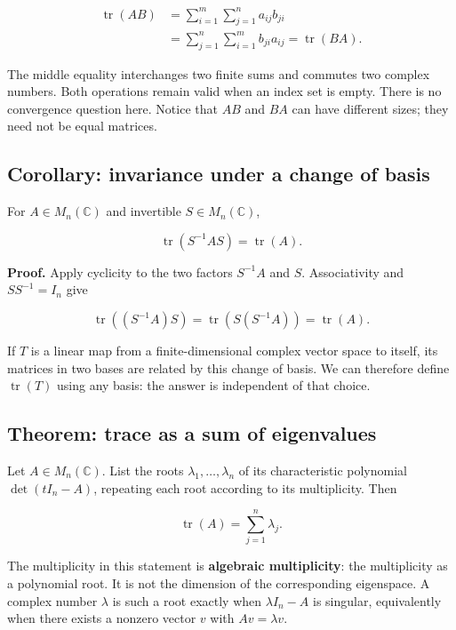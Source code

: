 \[
\begin{aligned}
\operatorname{tr}(AB)
&=\sum_{i=1}^{m}\sum_{j=1}^{n}a_{ij}b_{ji}\\
&=\sum_{j=1}^{n}\sum_{i=1}^{m}b_{ji}a_{ij}
=\operatorname{tr}(BA).
\end{aligned}
\]

The middle equality interchanges two finite sums and commutes two complex numbers. Both operations remain valid when an index set is empty. There is no convergence question here. Notice that \(AB\) and \(BA\) can have different sizes; they need not be equal matrices.

\subsection{Corollary: invariance under a change of basis}\label{linear-algebra.trace-similarity}

For \(A\in M_n(\mathbb C)\) and invertible \(S\in M_n(\mathbb C)\),

\[
\operatorname{tr}(S^{-1}AS)=\operatorname{tr}(A).
\]

\textbf{Proof.} Apply cyclicity to the two factors \(S^{-1}A\) and \(S\). Associativity and \(SS^{-1}=I_n\) give

\[
\operatorname{tr}((S^{-1}A)S)
=\operatorname{tr}(S(S^{-1}A))
=\operatorname{tr}(A).
\]

If \(T\) is a linear map from a finite-dimensional complex vector space to itself, its matrices in two bases are related by this change of basis. We can therefore define \(\operatorname{tr}(T)\) using any basis: the answer is independent of that choice.

\subsection{Theorem: trace as a sum of eigenvalues}\label{linear-algebra.trace-eigenvalue-sum}

Let \(A\in M_n(\mathbb C)\). List the roots \(\lambda_1,\ldots,\lambda_n\) of its characteristic polynomial \(\det(tI_n-A)\), repeating each root according to its multiplicity. Then

\[
\operatorname{tr}(A)=\sum_{j=1}^{n}\lambda_j.
\]

The multiplicity in this statement is \textbf{algebraic multiplicity}: the multiplicity as a polynomial root. It is not the dimension of the corresponding eigenspace. A complex number \(\lambda\) is such a root exactly when \(\lambda I_n-A\) is singular, equivalently when there exists a nonzero vector \(v\) with \(Av=\lambda v\).

